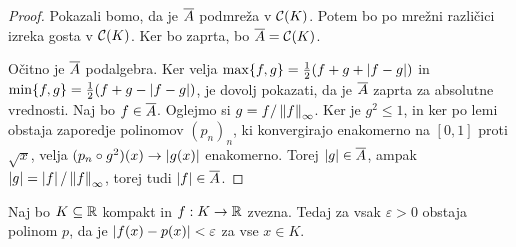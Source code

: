 \begin{proof}
  Pokazali bomo, da je $\overline{A}$ podmreža v $\mathcal{C}(K)$.
  Potem bo po mrežni različici izreka gosta v $\mathcal{C}(K)$.
  Ker bo zaprta, bo $\overline{A} = \mathcal{C}(K)$.

  Očitno je $\overline{A}$ podalgebra.
  Ker velja $\max\{f,g\} = \frac{1}{2} (f + g + \left| f-g \right|)$ in $\min\{f,g\} = \frac{1}{2}(f+g
  - \left| f-g \right|)$, je dovolj pokazati, da je $\overline{A}$ zaprta za absolutne
  vrednosti.
  Naj bo $f \in \overline{A}$.
  Oglejmo si $g = f / \left\lVert f\right\rVert_\infty$.
  Ker je $g^2 \le 1$, in ker po lemi obstaja zaporedje polinomov $(p_n)_n$, ki
  konvergirajo enakomerno na $[0,1]$ proti $\sqrt{x}$, velja $(p_n \circ g^2)(x)
  \to \left| g(x) \right|$ enakomerno.
  Torej $\left| g \right| \in \overline{A}$, ampak $\left| g \right| = \left| f \right| / \left\lVert f\right\rVert_\infty$, torej
  tudi $\left| f \right| \in \overline{A}$.
\end{proof}

\begin{izrek}[Weierstrass]
  Naj bo $K \subseteq \mathbb{R}$ kompakt in $f: K \to \mathbb{R}$ zvezna.
  Tedaj za vsak $\varepsilon > 0$ obstaja polinom $p$, da je $\left| f(x) - p(x) \right|
  < \varepsilon$ za vse $x \in K$.
\end{izrek}

